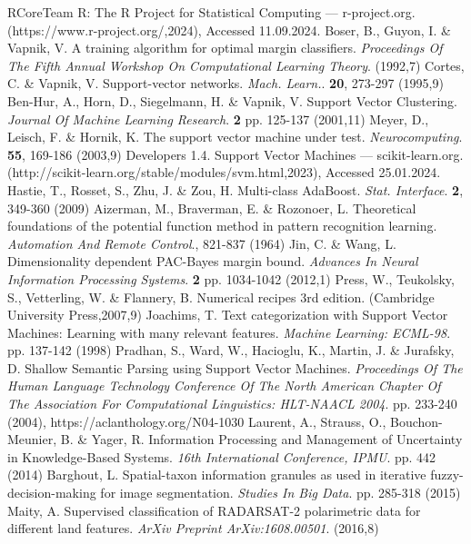 \documentclass[sn-mathphys-num]{sn-jnl}%
\begin{document}
\begin{thebibliography}{000}
RCoreTeam R: The R Project for Statistical Computing — r-project.org. (https://www.r-project.org/,2024), Accessed 11.09.2024.
Boser, B., Guyon, I. \& Vapnik, V. A training algorithm for optimal margin classifiers. {\em Proceedings Of The Fifth Annual Workshop On Computational Learning Theory}. (1992,7)
Cortes, C. \& Vapnik, V. Support-vector networks. {\em Mach. Learn.}. \textbf{20}, 273-297 (1995,9)
Ben-Hur, A., Horn, D., Siegelmann, H. \& Vapnik, V. Support Vector Clustering. {\em Journal Of Machine Learning Research}. \textbf{2} pp. 125-137 (2001,11)
Meyer, D., Leisch, F. \& Hornik, K. The support vector machine under test. {\em Neurocomputing}. \textbf{55}, 169-186 (2003,9)
Developers 1.4. Support Vector Machines — scikit-learn.org. (http://scikit-learn.org/stable/modules/svm.html,2023), Accessed 25.01.2024.
Hastie, T., Rosset, S., Zhu, J. \& Zou, H. Multi-class AdaBoost. {\em Stat. Interface}. \textbf{2}, 349-360 (2009)
Aizerman, M., Braverman, E. \& Rozonoer, L. Theoretical foundations of the potential function method in pattern recognition learning. {\em Automation And Remote Control}., 821-837 (1964)
Jin, C. \& Wang, L. Dimensionality dependent PAC-Bayes margin bound. {\em Advances In Neural Information Processing Systems}. \textbf{2} pp. 1034-1042 (2012,1)
Press, W., Teukolsky, S., Vetterling, W. \& Flannery, B. Numerical recipes 3rd edition. (Cambridge University Press,2007,9)
Joachims, T. Text categorization with Support Vector Machines: Learning with many relevant features. {\em Machine Learning: ECML-98}. pp. 137-142 (1998)
Pradhan, S., Ward, W., Hacioglu, K., Martin, J. \& Jurafsky, D. Shallow Semantic Parsing using Support Vector Machines. {\em Proceedings Of The Human Language Technology Conference Of The North American Chapter Of The Association For Computational Linguistics: HLT-NAACL 2004}. pp. 233-240 (2004), https://aclanthology.org/N04-1030
Laurent, A., Strauss, O., Bouchon-Meunier, B. \& Yager, R. Information Processing and Management of Uncertainty in Knowledge-Based Systems. {\em 16th International Conference, IPMU}. pp. 442 (2014)
Barghout, L. Spatial-taxon information granules as used in iterative fuzzy-decision-making for image segmentation. {\em Studies In Big Data}. pp. 285-318 (2015)
Maity, A. Supervised classification of RADARSAT-2 polarimetric data for different land features. {\em ArXiv Preprint ArXiv:1608.00501}. (2016,8)

\end{thebibliography}
\end{document}
